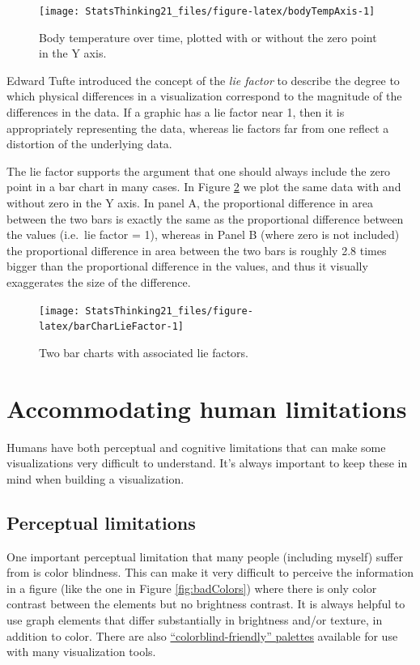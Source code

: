 \documentclass[
  12pt,
]{book}
\begin{document}
\begin{figure}
\texttt{[image: StatsThinking21\_files/figure-latex/bodyTempAxis-1]} \caption{Body temperature over time, plotted with or without the zero point in the Y axis.}\label{fig:bodyTempAxis}
\end{figure}

Edward Tufte introduced the concept of the \emph{lie factor} to describe the degree to which physical differences in a visualization correspond to the magnitude of the differences in the data. If a graphic has a lie factor near 1, then it is appropriately representing the data, whereas lie factors far from one reflect a distortion of the underlying data.

The lie factor supports the argument that one should always include the zero point in a bar chart in many cases. In Figure \ref{fig:barCharLieFactor} we plot the same data with and without zero in the Y axis. In panel A, the proportional difference in area between the two bars is exactly the same as the proportional difference between the values (i.e.~lie factor = 1), whereas in Panel B (where zero is not included) the proportional difference in area between the two bars is roughly 2.8 times bigger than the proportional difference in the values, and thus it visually exaggerates the size of the difference.

\begin{figure}
\texttt{[image: StatsThinking21\_files/figure-latex/barCharLieFactor-1]} \caption{Two bar charts with associated lie factors.}\label{fig:barCharLieFactor}
\end{figure}

\hypertarget{accommodating-human-limitations}{%
\section{Accommodating human limitations}\label{accommodating-human-limitations}}

Humans have both perceptual and cognitive limitations that can make some visualizations very difficult to understand. It's always important to keep these in mind when building a visualization.

\hypertarget{perceptual-limitations}{%
\subsection{Perceptual limitations}\label{perceptual-limitations}}

One important perceptual limitation that many people (including myself) suffer from is color blindness. This can make it very difficult to perceive the information in a figure (like the one in Figure \ref{fig:badColors}) where there is only color contrast between the elements but no brightness contrast. It is always helpful to use graph elements that differ substantially in brightness and/or texture, in addition to color. There are also \href{http://www.cookbook-r.com/Graphs/Colors_(ggplot2)/\#a-colorblind-friendly-palette}{``colorblind-friendly'' palettes} available for use with many visualization tools.
\end{document}
